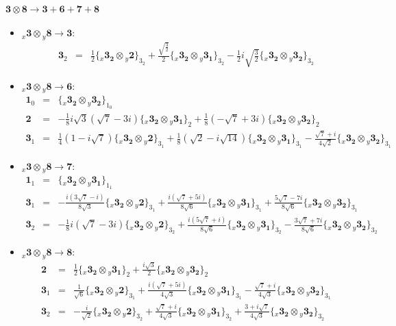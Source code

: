 \documentclass[english]{article}
\newcommand{\rep}[1]{\mathbf{#1}}
\newcommand{\repx}[2]{{}_{#2}\mathbf{#1}}
\newcommand{\subcg}[3]{\big\{ \repx{#1}{x}\otimes\repx{#2}{y}\big\}^{}_{#3}}
\begin{document}
\paragraph*{\Large $\rep{3}\otimes\rep{8}\to\rep{3}+\rep{6}+\rep{7}+\rep{8}$}
\begin{itemize}
\item $\repx{3}{x}\otimes\repx{8}{y}\to\rep{3}$:
\begin{eqnarray*}
\rep{3}_{2} &=& \frac{1}{2}\subcg{3_{2}}{2}{3_{2}}+\frac{\sqrt{\frac{3}{2}}}{2}\subcg{3_{2}}{3_{1}}{3_{2}}-\frac{1}{2} i \sqrt{\frac{3}{2}}\subcg{3_{2}}{3_{2}}{3_{2}}
\end{eqnarray*}
\item $\repx{3}{x}\otimes\repx{8}{y}\to\rep{6}$:
\begin{eqnarray*}
\rep{1}_{0} &=& \subcg{3_{2}}{3_{2}}{1_{0}}
\\
\rep{2} &=& -\frac{1}{8} i \sqrt{3} \left(\sqrt{7}-3 i\right)\subcg{3_{2}}{3_{1}}{2}+\frac{1}{8} \left(-\sqrt{7}+3 i\right)\subcg{3_{2}}{3_{2}}{2}
\\
\rep{3}_{1} &=& \frac{1}{4} \left(1-i \sqrt{7}\right)\subcg{3_{2}}{2}{3_{1}}+\frac{1}{8} \left(\sqrt{2}-i \sqrt{14}\right)\subcg{3_{2}}{3_{1}}{3_{1}}-\frac{\sqrt{7}+i}{4 \sqrt{2}}\subcg{3_{2}}{3_{2}}{3_{1}}
\end{eqnarray*}
\item $\repx{3}{x}\otimes\repx{8}{y}\to\rep{7}$:
\begin{eqnarray*}
\rep{1}_{1} &=& \subcg{3_{2}}{3_{1}}{1_{1}}
\\
\rep{3}_{1} &=& -\frac{i \left(3 \sqrt{7}-i\right)}{8 \sqrt{3}}\subcg{3_{2}}{2}{3_{1}}+\frac{i \left(\sqrt{7}+5 i\right)}{8 \sqrt{6}}\subcg{3_{2}}{3_{1}}{3_{1}}+\frac{5 \sqrt{7}-7 i}{8 \sqrt{6}}\subcg{3_{2}}{3_{2}}{3_{1}}
\\
\rep{3}_{2} &=& -\frac{1}{8} i \left(\sqrt{7}-3 i\right)\subcg{3_{2}}{2}{3_{2}}+\frac{i \left(5 \sqrt{7}+i\right)}{8 \sqrt{6}}\subcg{3_{2}}{3_{1}}{3_{2}}-\frac{3 \sqrt{7}+7 i}{8 \sqrt{6}}\subcg{3_{2}}{3_{2}}{3_{2}}
\end{eqnarray*}
\item $\repx{3}{x}\otimes\repx{8}{y}\to\rep{8}$:
\begin{eqnarray*}
\rep{2} &=& \frac{1}{2}\subcg{3_{2}}{3_{1}}{2}+\frac{i \sqrt{3}}{2}\subcg{3_{2}}{3_{2}}{2}
\\
\rep{3}_{1} &=& \frac{1}{\sqrt{6}}\subcg{3_{2}}{2}{3_{1}}+\frac{i \left(\sqrt{7}+5 i\right)}{4 \sqrt{3}}\subcg{3_{2}}{3_{1}}{3_{1}}-\frac{\sqrt{7}+i}{4 \sqrt{3}}\subcg{3_{2}}{3_{2}}{3_{1}}
\\
\rep{3}_{2} &=& -\frac{i}{\sqrt{2}}\subcg{3_{2}}{2}{3_{2}}+\frac{\sqrt{7}+i}{4 \sqrt{3}}\subcg{3_{2}}{3_{1}}{3_{2}}+\frac{3+i \sqrt{7}}{4 \sqrt{3}}\subcg{3_{2}}{3_{2}}{3_{2}}
\end{eqnarray*}
\end{itemize}
\end{document}
